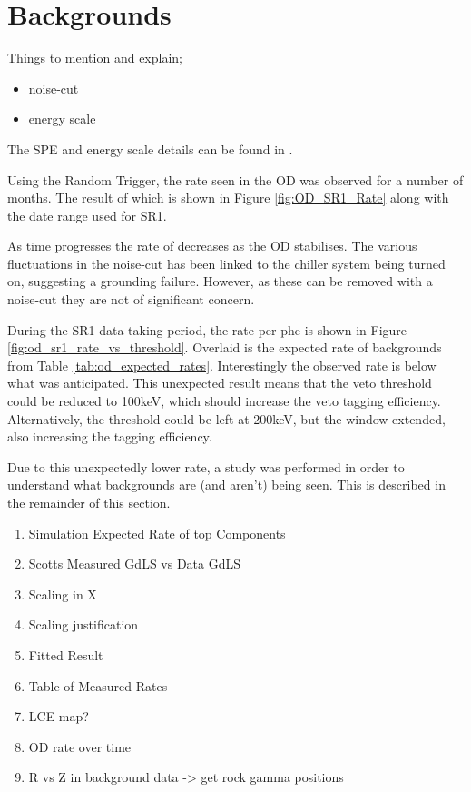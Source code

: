 \section{Backgrounds}
Things to mention and explain;
\begin{itemize}
    \item noise-cut
    \item energy scale
\end{itemize}

The SPE and energy scale details can be found in \cite{ewanfraser_thesis_ref}.

\par
Using the Random Trigger, the rate seen in the OD was observed for a number of months.
The result of which is shown in Figure \ref{fig:OD_SR1_Rate} along with the date range used for SR1.
\par
As time progresses the rate of decreases as the OD stabilises.
The various fluctuations in the noise-cut has been linked to the chiller system being turned on, suggesting a grounding failure.
However, as these can be removed with a noise-cut they are not of significant concern.


\par
During the SR1 data taking period, the rate-per-phe is shown in Figure \ref{fig:od_sr1_rate_vs_threshold}.
Overlaid is the expected rate of backgrounds from Table \ref{tab:od_expected_rates}.
Interestingly the observed rate is below what was anticipated.
This unexpected result means that the veto threshold could be reduced to 100keV, which should increase the veto tagging efficiency.
Alternatively, the threshold could be left at 200keV, but the window extended, also increasing the tagging efficiency.



\par
Due to this unexpectedly lower rate, a study was performed in order to understand what backgrounds are (and aren't) being seen.
This is described in the remainder of this section.


\begin{tcolorbox}[colback=red!5!white, colframe=red!50!black, title=Key Plots]
\begin{enumerate}
    \item Simulation Expected Rate of top Components
    \item Scotts Measured GdLS vs Data GdLS
    \item Scaling in X
    \item Scaling justification
    \item Fitted Result
    \item Table of Measured Rates
    \item LCE map?
    \item OD rate over time
    \item R vs Z in background data -> get rock gamma positions    
\end{enumerate}
\end{tcolorbox}


